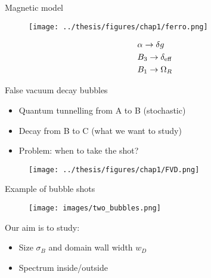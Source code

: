 \documentclass[aspectratio=169]{beamer}
\begin{document}
\begin{frame}{Magnetic model}
  \begin{minipage}{0.7\textwidth}
    \begin{figure}
      \centering
      \texttt{[image: ../thesis/figures/chap1/ferro.png]}
    \end{figure} 
  \end{minipage}
  \hspace{0.01\textwidth}
  \begin{minipage}{0.27\textwidth}
    \begin{align*}
      &\alpha\to\delta g\\
      &B_3\to\delta_{\rm eff}\\
      &B_1\to\Omega_R
    \end{align*}
  \end{minipage}
\end{frame} 

\begin{frame}{False vacuum decay bubbles}
  \begin{minipage}{0.32\textwidth}
    \begin{itemize}
      \item Quantum tunnelling from A to B (stochastic)
      \item Decay from B to C (what we want to study)
      \item Problem: when to take the shot?
    \end{itemize}
  \end{minipage}
  \hspace{0.01\textwidth}
  \begin{minipage}{0.65\textwidth}
    \begin{figure}
      \centering
      \texttt{[image: ../thesis/figures/chap1/FVD.png]}
    \end{figure} 
  \end{minipage}
\end{frame}

\begin{frame}{Example of bubble shots}
  \begin{figure}
    \centering
    \texttt{[image: images/two\_bubbles.png]}
  \end{figure}
  Our aim is to study:
  \begin{itemize}
    \item Size $\sigma_B$ and domain wall width $w_D$
    \item Spectrum inside/outside
  \end{itemize}
\end{frame}
\end{document}
